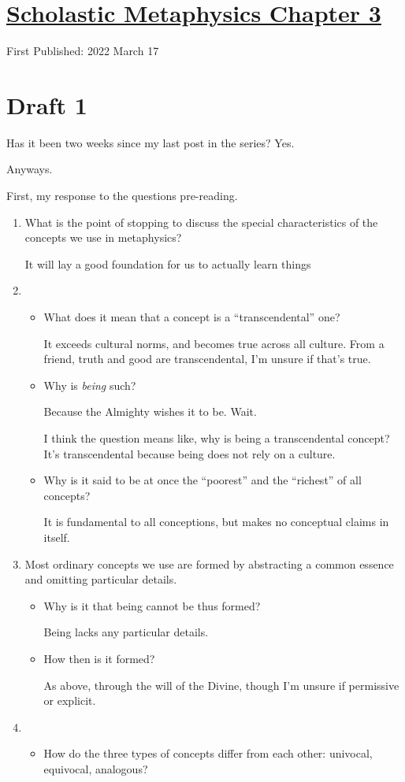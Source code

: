 \documentclass[12pt]{article}[titlepage]
\newcommand{\say}[1]{``#1''}
\newcommand{\1}{\={a}}
\newcommand{\2}{\={e}}
\newcommand{\3}{\={\i}}
\newcommand{\4}{\=o}
\newcommand{\5}{\=u}
\newcommand{\6}{\={A}}
\renewcommand{\,}{\textsuperscript{,}}
\begin{document}
\doublespacing
\section{\href{scholastic-metaphysics-4.html}{Scholastic Metaphysics Chapter 3}}
First Published: 2022 March 17

\section{Draft 1}
Has it been two weeks since my last post in the series?
Yes.

Anyways.

First, my response to the questions pre-reading.
\begin{enumerate}
\item What is the point of stopping to discuss the special characteristics of the concepts we use in metaphysics?

It will lay a good foundation for us to actually learn things
\item \begin{itemize}
\item What does it mean that a concept is a \say{transcendental} one?

It exceeds cultural norms, and becomes true across all culture.
From a friend, truth and good are transcendental, I'm unsure if that's true.
\item Why is \emph{being} such?

Because the Almighty wishes it to be.
Wait.

I think the question means like, why is being a transcendental concept?
It's transcendental because being does not rely on a culture.
\item Why is it said to be at once the \say{poorest} and the \say{richest} of all concepts?

It is fundamental to all conceptions, but makes no conceptual claims in itself.
\end{itemize}
\item Most ordinary concepts we use are formed by abstracting a common essence and omitting particular details.
\begin{itemize}
\item Why is it that being cannot be thus formed?

Being lacks any particular details.
\item How then is it formed?

As above, through the will of the Divine, though I'm unsure if permissive or explicit.
\end{itemize}
\item \begin{itemize}
\item How do the three types of concepts differ from each other: univocal, equivocal, analogous?


\end{itemize}
\end{enumerate}
\end{document}
